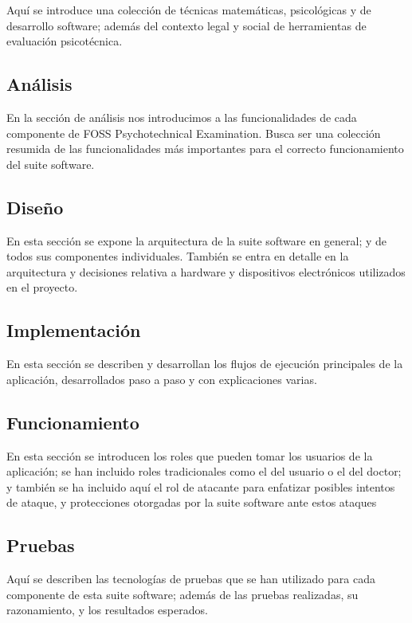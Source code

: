 \documentclass[12pt,a4paper,twoside,openright]{book}
\begin{document}
Aquí se introduce una colección de técnicas matemáticas, psicológicas y de desarrollo software; además del contexto legal y social de herramientas de evaluación psicotécnica.

\subsection{Análisis}

En la sección de análisis nos introducimos a las funcionalidades de cada componente de FOSS Psychotechnical Examination. Busca ser una colección resumida de las funcionalidades más importantes para el correcto funcionamiento del suite software.

\subsection{Diseño}

En esta sección se expone la arquitectura de la suite software en general; y de todos sus componentes individuales. También se entra en detalle en la arquitectura y decisiones relativa a hardware y dispositivos electrónicos utilizados en el proyecto.

\subsection{Implementación}

En esta sección se describen y desarrollan los flujos de ejecución principales de la aplicación, desarrollados paso a paso y con explicaciones varias.

\subsection{Funcionamiento}

En esta sección se introducen los roles que pueden tomar los usuarios de la aplicación; se han incluido roles tradicionales como el del usuario o el del doctor; y también se ha incluido aquí el rol de atacante para enfatizar posibles intentos de ataque, y protecciones otorgadas por la suite software ante estos ataques

\subsection{Pruebas}

Aquí se describen las tecnologías de pruebas que se han utilizado para cada componente de esta suite software; además de las pruebas realizadas, su razonamiento, y los resultados esperados.
\end{document}
